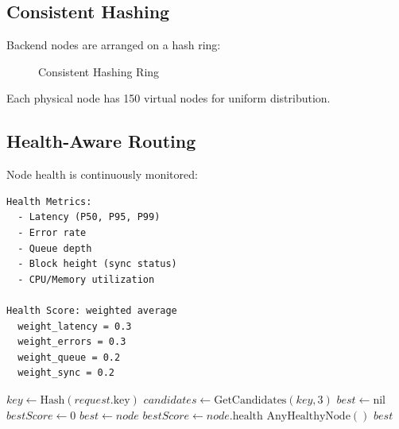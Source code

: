 \documentclass[11pt,a4paper]{article}
\begin{document}
\subsection{Consistent Hashing}

Backend nodes are arranged on a hash ring:

\begin{figure}[htbp]
\centering
{}
\caption{Consistent Hashing Ring}
\label{fig:hashring}
\end{figure}

Each physical node has 150 virtual nodes for uniform distribution.

\subsection{Health-Aware Routing}

Node health is continuously monitored:

\begin{lstlisting}
Health Metrics:
  - Latency (P50, P95, P99)
  - Error rate
  - Queue depth
  - Block height (sync status)
  - CPU/Memory utilization

Health Score: weighted average
  weight_latency = 0.3
  weight_errors = 0.3
  weight_queue = 0.2
  weight_sync = 0.2
\end{lstlisting}

\begin{algorithm}
\caption{Health-Aware Node Selection}
\begin{algorithmic}[1]
    \State $key \gets \text{Hash}(request.\text{key})$
    \State $candidates \gets \text{GetCandidates}(key, 3)$ 
    \State $best \gets \text{nil}$
    \State $bestScore \gets 0$
            \State $best \gets node$
            \State $bestScore \gets node.\text{health}$
        \EndIf
    \EndFor
        \Return $\text{AnyHealthyNode}()$ 
    \EndIf
    \Return $best$
\EndProcedure
\end{algorithmic}
\end{algorithm}
\end{document}
